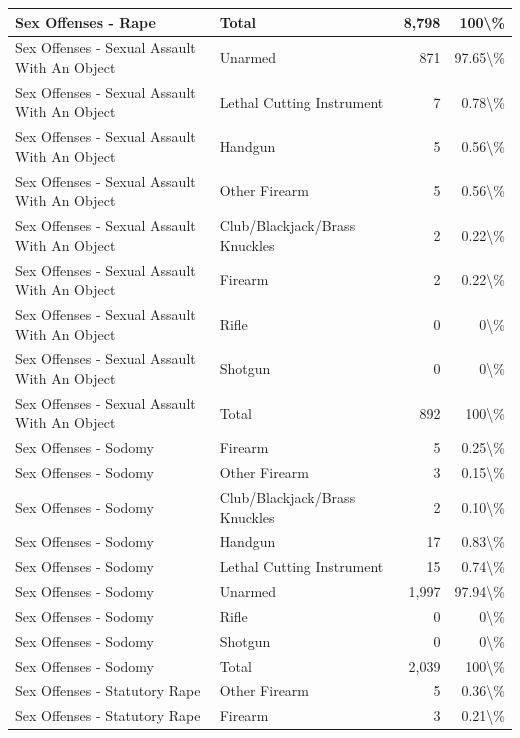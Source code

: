\documentclass[
]{krantz}
\begin{document}
\begin{longtable}[t]{l|l|r|r}
\hline
Sex Offenses - Rape & Total & 8,798 & 100\textbackslash{}\%\\
\hline
Sex Offenses - Sexual Assault With An Object & Unarmed & 871 & 97.65\textbackslash{}\%\\
\hline
Sex Offenses - Sexual Assault With An Object & Lethal Cutting Instrument & 7 & 0.78\textbackslash{}\%\\
\hline
Sex Offenses - Sexual Assault With An Object & Handgun & 5 & 0.56\textbackslash{}\%\\
\hline
Sex Offenses - Sexual Assault With An Object & Other Firearm & 5 & 0.56\textbackslash{}\%\\
\hline
Sex Offenses - Sexual Assault With An Object & Club/Blackjack/Brass Knuckles & 2 & 0.22\textbackslash{}\%\\
\hline
Sex Offenses - Sexual Assault With An Object & Firearm & 2 & 0.22\textbackslash{}\%\\
\hline
Sex Offenses - Sexual Assault With An Object & Rifle & 0 & 0\textbackslash{}\%\\
\hline
Sex Offenses - Sexual Assault With An Object & Shotgun & 0 & 0\textbackslash{}\%\\
\hline
Sex Offenses - Sexual Assault With An Object & Total & 892 & 100\textbackslash{}\%\\
\hline
Sex Offenses - Sodomy & Firearm & 5 & 0.25\textbackslash{}\%\\
\hline
Sex Offenses - Sodomy & Other Firearm & 3 & 0.15\textbackslash{}\%\\
\hline
Sex Offenses - Sodomy & Club/Blackjack/Brass Knuckles & 2 & 0.10\textbackslash{}\%\\
\hline
Sex Offenses - Sodomy & Handgun & 17 & 0.83\textbackslash{}\%\\
\hline
Sex Offenses - Sodomy & Lethal Cutting Instrument & 15 & 0.74\textbackslash{}\%\\
\hline
Sex Offenses - Sodomy & Unarmed & 1,997 & 97.94\textbackslash{}\%\\
\hline
Sex Offenses - Sodomy & Rifle & 0 & 0\textbackslash{}\%\\
\hline
Sex Offenses - Sodomy & Shotgun & 0 & 0\textbackslash{}\%\\
\hline
Sex Offenses - Sodomy & Total & 2,039 & 100\textbackslash{}\%\\
\hline
Sex Offenses - Statutory Rape & Other Firearm & 5 & 0.36\textbackslash{}\%\\
\hline
Sex Offenses - Statutory Rape & Firearm & 3 & 0.21\textbackslash{}\%\\

\end{longtable}
\end{document}
